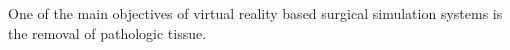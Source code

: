 \label{chapter:Cutting}
One of the main objectives of virtual reality based surgical simulation systems is the removal of pathologic tissue. 